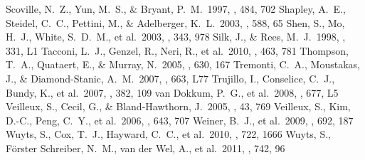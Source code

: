 \documentclass[apj]{emulateapj}
\begin{document}
\begin{thebibliography}{}
 Scoville, N.~Z., Yun, M.~S., \&
  Bryant, P.~M.\ 1997, \apj, 484, 702
 Shapley, A.~E., Steidel, C.~C.,
  Pettini, M., \& Adelberger, K.~L.\ 2003, \apj, 588, 65
 Shen, S., Mo, H.~J., White,
  S.~D.~M., et al.\ 2003, \mnras, 343, 978
 Silk, J., \& Rees, M.~J.\ 1998,
  \aap, 331, L1
 Tacconi, L.~J., Genzel, R.,
  Neri, R., et al.\ 2010, \nat, 463, 781
 Thompson, T.~A., Quataert, E.,
  \& Murray, N.\ 2005, \apj, 630, 167
 Tremonti, C.~A., Moustakas, J.,
  \& Diamond-Stanic, A.~M.\ 2007, \apjl, 663, L77
 Trujillo, I., Conselice, C.~J.,
  Bundy, K., et al.\ 2007, \mnras, 382, 109
 van Dokkum, P.~G., et
  al.\ 2008, \apjl, 677, L5
 Veilleux, S., Cecil, G., \&
  Bland-Hawthorn, J.\ 2005, \araa, 43, 769
 Veilleux, S., Kim, D.-C., Peng,
  C.~Y., et al.\ 2006, \apj, 643, 707
 Weiner, B.~J., et al.\ 2009,
  \apj, 692, 187
 Wuyts, S., Cox, T.~J., Hayward,
  C.~C., et al.\ 2010, \apj, 722, 1666
 Wuyts, S., F{\"o}rster Schreiber,
  N.~M., van der Wel, A., et al.\ 2011, \apj, 742, 96
\end{thebibliography}
\end{document}

